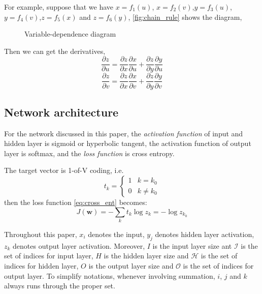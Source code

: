 \documentclass[12pt]{article}
\numberwithin{equation}{section}
\begin{document}
For example, suppose that we have $x=f_1(u)$, $x=f_2(v)$,$y=f_3(u)$,$y=f_4(v)$,$z=f_5(x)$ and $z=f_6(y)$,
\autoref{fig:chain_rule} shows the diagram,
\begin{figure}[ht]
\begin{center}
  
  
  \caption{Variable-dependence diagram}
  \label{fig:chain_rule}
\end{center}
\end{figure}

Then we can get the derivatives,
$$
    \frac{\partial z}{\partial u} = \frac{\partial z}{\partial x}\frac{\partial x}{\partial u} +  \frac{\partial z}{\partial y}\frac{\partial y}{\partial u}
$$
$$
    \frac{\partial z}{\partial v} = \frac{\partial z}{\partial x}\frac{\partial x}{\partial v} +  \frac{\partial z}{\partial y}\frac{\partial y}{\partial v}
$$

\subsection{Network architecture}
For the network discussed in this paper, the \textit{activation function} of input and hidden layer is sigmoid or hyperbolic tangent,
the activation function of output layer is softmax, and the \textit{loss function} is cross entropy.

The target vector is 1-of-V coding, i.e.
$$
    t_k = \left\{\begin{array}{rl}
                                    1 & k = k_0 \\
                                    0 & k \neq k_0 
                                \end{array} \right.
$$
then the loss function \eqref{eq:cross_ent} becomes:
\begin{equation}  \label{eq:loss}
    J(\bm{w}) = -\sum_k t_k\log z_k = -\log z_{k_0}
\end{equation}

Throughout this paper, $x_i$ denotes the input, $y_j$ denotes hidden layer activation,
$z_k$ denotes output layer activation. Moreover, $I$ is the input layer size ant $\mathcal{I}$ is the set of indices for input layer, 
$H$ is the hidden layer size and $\mathcal{H}$ is the set of indices for hidden layer,
$O$ is the output layer size  and $\mathcal{O}$ is the set of indices for output layer. 
To simplify notations, whenever involving summation, $i$, $j$ and $k$ always
runs through the proper set.
\end{document}
